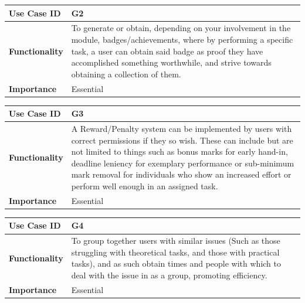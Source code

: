 \documentclass[a4paper,12pt]{article}
\begin{document}
        	\begin{center}
        		\begin{tabularx}{\textwidth}{ |X|X| }
        			
        			\hline
        			\textbf{Use Case ID} & G2 \\
        			\hline
        			\textbf{Functionality} & To generate or obtain, depending on your involvement in the module, badges/achievements, where by performing a specific task, a user can obtain said badge as proof they have accomplished something worthwhile, and strive towards obtaining a collection of them. \\
        			\hline
        			\textbf{Importance} & Essential \\
        			\hline
        			
        		\end{tabularx}
        	\end{center}
        	
        	\begin{center}
        		\begin{tabularx}{\textwidth}{ |X|X| }
        			
        			\hline
        			\textbf{Use Case ID} & G3 \\
        			\hline
        			\textbf{Functionality} & A Reward/Penalty system can be implemented by users with correct permissions if they so wish. These can include but are not limited to things such as bonus marks for early hand-in, deadline leniency for exemplary performance or sub-minimum mark removal for individuals who show an increased effort or perform well enough in an assigned task. \\
        			\hline
        			\textbf{Importance} & Essential \\
        			\hline
        			
        		\end{tabularx}
        	\end{center}
        	
        	\begin{center}
        		\begin{tabularx}{\textwidth}{ |X|X| }
        			
        			\hline
        			\textbf{Use Case ID} & G4 \\
        			\hline
        			\textbf{Functionality} & To group together users with similar issues (Such as those struggling with theoretical tasks, and those with practical tasks), and as such obtain times and people with which to deal with the issue in as a group, promoting efficiency. \\
        			\hline
        			\textbf{Importance} & Essential \\
        			\hline
        			
        		\end{tabularx}
        	\end{center}
        	
\end{document}
